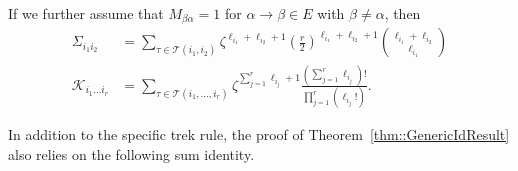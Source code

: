 \documentclass{biometrika}
\begin{document}
\begin{corollary}
\label{cor::simplifiedTrekRuleDAGs}
        If we further assume that $M_{\beta \alpha} = 1$ for $\alpha \rightarrow \beta \in E$ with $\beta \neq \alpha$, then 
  \begin{align*}
        \Sigma_{i_1 i_2} &=  \sum_{ \tau \in \mathcal{T}(i_1, i_2)} \zeta^{\ell_{i_1} + \ell_{i_2} + 1}  \left(\frac{r}{2} \right )^{\ell_{i_1} + \ell_{i_2} + 1}  \binom{\ell_{i_1} + \ell_{i_2}}{\ell_{i_1}}\\ 
        \mathcal{K} _{i_1 \dots i_r} &= \sum_{ \tau \in \mathcal{T}(i_1, \dots, i_r)}  \zeta^{\sum_{j = 1}^r\ell_{i_j} +1} \frac{(\sum_{j = 1}^r\ell_{i_j} )!}{\prod_{j = 1}^r(\ell_{i_j}!) }.
    \end{align*}
\end{corollary}

In addition to the specific trek rule, the proof of Theorem~\ref{thm::GenericIdResult} 
also relies on the following sum identity.
\end{document}
